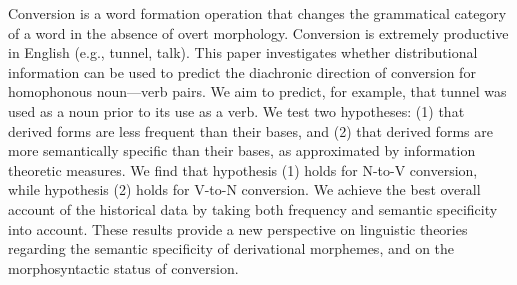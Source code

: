 Conversion is a word formation operation that changes the grammatical category of a word in the absence of overt morphology. Conversion is extremely productive in English (e.g., tunnel, talk). This paper investigates whether distributional information can be used to predict the diachronic direction of conversion for homophonous noun---verb pairs. We aim to predict, for example, that tunnel was used as a noun prior to its use as a verb. We test two hypotheses: (1) that derived forms are less frequent than their bases, and (2) that derived forms are more semantically specific than their bases, as approximated by information theoretic measures. We find that hypothesis (1) holds for N-to-V conversion, while hypothesis (2) holds for V-to-N conversion. We achieve the best overall account of the historical data by taking both frequency and semantic specificity into account. These results provide a new perspective on linguistic theories regarding the semantic specificity of derivational morphemes, and on the morphosyntactic status of conversion.
